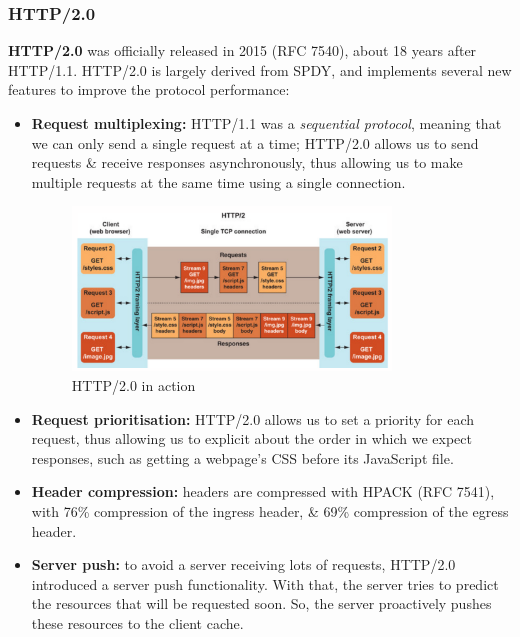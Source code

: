 \documentclass[a4paper,11pt]{article}
\begin{document}
\subsubsection{HTTP/2.0}
\textbf{HTTP/2.0} was officially released in 2015 (RFC 7540), about 18 years after HTTP/1.1.
HTTP/2.0 is largely derived from SPDY, and implements several new features to improve the protocol performance:
\begin{itemize}
    \item   \textbf{Request multiplexing:} HTTP/1.1 was a \textit{sequential protocol}, meaning that we can only send a single request at a time;
            HTTP/2.0 allows us to send requests \& receive responses asynchronously, thus allowing us to make multiple requests at the same time using a single connection.
            \begin{figure}[H]
                \centering
                \includegraphics[width=0.8\textwidth]{./images/http2action.png}
                \caption{HTTP/2.0 in action}
            \end{figure}

    \item   \textbf{Request prioritisation:} HTTP/2.0 allows us to set a priority for each request, thus allowing us to explicit about the order in which we expect responses, such as getting a webpage's CSS before its JavaScript file.

    \item   \textbf{Header compression:} headers are compressed with HPACK (RFC 7541), with 76\% compression of the ingress header, \& 69\% compression of the egress header.

    \item   \textbf{Server push:} to avoid a server receiving lots of requests, HTTP/2.0 introduced a server push functionality.
            With that, the server tries to predict the resources that will be requested soon.
            So, the server proactively pushes these resources to the client cache.
\end{itemize}
\end{document}
